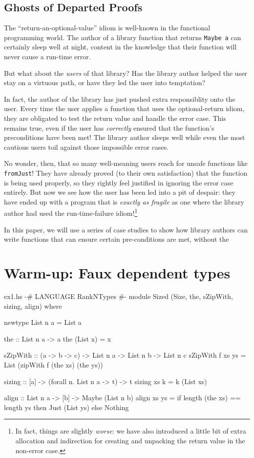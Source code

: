 \documentclass[format=sigplan, review=false, screen=true]{acmart}
\begin{document}
\subsection{Ghosts of Departed Proofs}
The ``return-an-optional-value'' idiom is well-known in the functional programming world.
The author of a library function that returns \texttt{Maybe a} can certainly sleep well
at night, content in the knowledge that their function will never cause a run-time error.

But what about the \emph{users} of that library? Has the library author helped the user stay
on a virtuous path, or have they led the user into temptation?

In fact, the author of the library has just pushed extra responsiblity onto the user.
Every time the user applies a function that uses the optional-return idiom, they are obligated
to test the return value and handle the error case. This remains true, even if the user
has \emph{correctly} ensured that the function's preconditions have been met! The library
author sleeps well while even the most cautious users toil against those impossible error cases.

No wonder, then, that so many well-meaning users reach for unsafe functions like \texttt{fromJust}!
They have already proved (to their own satisfaction) that the function is being used properly, so they rightly
feel justified in ignoring the error case entirely. But now we see how the user has been led into
a pit of despair: they have ended up with a program that is \emph{exactly as fragile} as one where the library
author had used the run-time-failure idiom!\footnote{In fact, things are slightly \emph{worse}: we have also introduced a little
bit of extra allocation and indirection for creating and unpacking the return value in the non-error case.}

In this paper, we will use a series of case studies to show how library authors can write
functions that can ensure certain pre-conditions are met, without the 

\section{Warm-up: Faux dependent types}

\begin{filecontents*}{ex1.hs}  
{-# LANGUAGE RankNTypes #-}
module Sized
  (Size, the, sZipWith, sizing, align) where

newtype List n a = List a

the :: List n a -> a
the (List x) = x

sZipWith :: (a -> b -> c)
         -> List n a
         -> List n b
         -> List n c
sZipWith f xs ys =
  List (zipWith f (the xs) (the ys))
  
sizing :: [a] -> (forall n. List n a -> t) -> t
sizing xs k = k (List xs)

align :: List n a -> [b] -> Maybe (List n b)
align xs ys = if length (the xs) == length ys
              then Just (List ys)
              else Nothing

\end{filecontents*}
\end{document}
